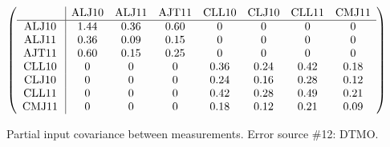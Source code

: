 \begin{table}[H]
\scriptsize
\begin{center}
\renewcommand{\arraystretch}{1.1}
\begin{math}\left(\begin{array}{c|ccccccc}
 & \mathrm{ALJ10} & 
\mathrm{ALJ11} & 
\mathrm{AJT11} & 
\mathrm{CLL10} & 
\mathrm{CLJ10} & 
\mathrm{CLL11} & 
\mathrm{CMJ11} \\
\hline
\mathrm{ALJ10} \hspace*{2pt} &       1.44 &       0.36 &       0.60 &  0 &  0 &  0 &  0 \\
\mathrm{ALJ11} \hspace*{2pt} &       0.36 &       0.09 &       0.15 &  0 &  0 &  0 &  0 \\
\mathrm{AJT11} \hspace*{2pt} &       0.60 &       0.15 &       0.25 &  0 &  0 &  0 &  0 \\
\mathrm{CLL10} \hspace*{2pt} &  0 &  0 &  0 &       0.36 &       0.24 &       0.42 &       0.18 \\
\mathrm{CLJ10} \hspace*{2pt} &  0 &  0 &  0 &       0.24 &       0.16 &       0.28 &       0.12 \\
\mathrm{CLL11} \hspace*{2pt} &  0 &  0 &  0 &       0.42 &       0.28 &       0.49 &       0.21 \\
\mathrm{CMJ11} \hspace*{2pt} &  0 &  0 &  0 &       0.18 &       0.12 &       0.21 &       0.09 \\
\end{array}\right)\end{math}
\caption{Partial input covariance between measurements. Error source \#12: DTMO.}
\renewcommand{\arraystretch}{1}
\end{center}
\end{table}
